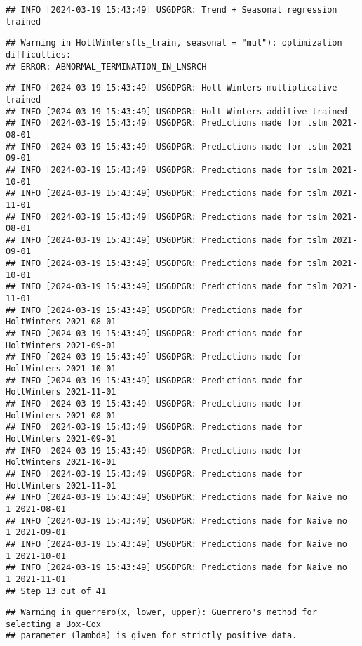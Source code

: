 \documentclass[
]{article}
\begin{document}
\begin{verbatim}
## INFO [2024-03-19 15:43:49] USGDPGR: Trend + Seasonal regression trained
\end{verbatim}

\begin{verbatim}
## Warning in HoltWinters(ts_train, seasonal = "mul"): optimization difficulties:
## ERROR: ABNORMAL_TERMINATION_IN_LNSRCH
\end{verbatim}

\begin{verbatim}
## INFO [2024-03-19 15:43:49] USGDPGR: Holt-Winters multiplicative trained
## INFO [2024-03-19 15:43:49] USGDPGR: Holt-Winters additive trained
## INFO [2024-03-19 15:43:49] USGDPGR: Predictions made for tslm 2021-08-01
## INFO [2024-03-19 15:43:49] USGDPGR: Predictions made for tslm 2021-09-01
## INFO [2024-03-19 15:43:49] USGDPGR: Predictions made for tslm 2021-10-01
## INFO [2024-03-19 15:43:49] USGDPGR: Predictions made for tslm 2021-11-01
## INFO [2024-03-19 15:43:49] USGDPGR: Predictions made for tslm 2021-08-01
## INFO [2024-03-19 15:43:49] USGDPGR: Predictions made for tslm 2021-09-01
## INFO [2024-03-19 15:43:49] USGDPGR: Predictions made for tslm 2021-10-01
## INFO [2024-03-19 15:43:49] USGDPGR: Predictions made for tslm 2021-11-01
## INFO [2024-03-19 15:43:49] USGDPGR: Predictions made for HoltWinters 2021-08-01
## INFO [2024-03-19 15:43:49] USGDPGR: Predictions made for HoltWinters 2021-09-01
## INFO [2024-03-19 15:43:49] USGDPGR: Predictions made for HoltWinters 2021-10-01
## INFO [2024-03-19 15:43:49] USGDPGR: Predictions made for HoltWinters 2021-11-01
## INFO [2024-03-19 15:43:49] USGDPGR: Predictions made for HoltWinters 2021-08-01
## INFO [2024-03-19 15:43:49] USGDPGR: Predictions made for HoltWinters 2021-09-01
## INFO [2024-03-19 15:43:49] USGDPGR: Predictions made for HoltWinters 2021-10-01
## INFO [2024-03-19 15:43:49] USGDPGR: Predictions made for HoltWinters 2021-11-01
## INFO [2024-03-19 15:43:49] USGDPGR: Predictions made for Naive no  1 2021-08-01
## INFO [2024-03-19 15:43:49] USGDPGR: Predictions made for Naive no  1 2021-09-01
## INFO [2024-03-19 15:43:49] USGDPGR: Predictions made for Naive no  1 2021-10-01
## INFO [2024-03-19 15:43:49] USGDPGR: Predictions made for Naive no  1 2021-11-01
## Step 13 out of 41
\end{verbatim}

\begin{verbatim}
## Warning in guerrero(x, lower, upper): Guerrero's method for selecting a Box-Cox
## parameter (lambda) is given for strictly positive data.
\end{verbatim}
\end{document}

